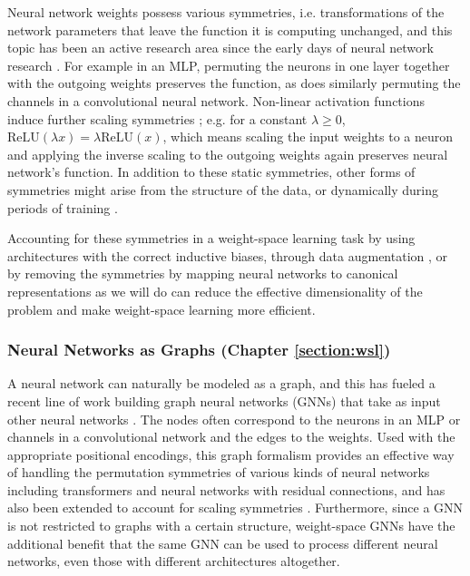Neural network weights possess various symmetries, i.e. transformations of the network parameters that leave the function it is computing unchanged, and this topic has been an active research area since the early days of neural network research \citep{hecht-nielsenALGEBRAICSTRUCTUREFEEDFORWARD1990}. For example in an MLP, permuting the neurons in one layer together with the outgoing weights preserves the function, as does similarly permuting the channels in a convolutional neural network. Non-linear activation functions induce further scaling symmetries \citep{godfreySymmetriesDeepLearning2022}; e.g. for a constant $\lambda \geq 0$, $\text{ReLU}(\lambda x) = \lambda \text{ReLU}(x)$, which means scaling the input weights to a neuron and applying the inverse scaling to the outgoing weights again preserves neural network's function. In addition to these static symmetries, other forms of symmetries might arise from the structure of the data, or dynamically during periods of training \citep{zhaoFindingSymmetryNeural2024}. 

Accounting for these symmetries in a weight-space learning task by using architectures with the correct inductive biases, through data augmentation \citep{shamsianImprovedGeneralizationWeight2024}, or by removing the symmetries by mapping neural networks to canonical representations \citep{pittorinoDeepNetworksToroids2022} as we will do can reduce the effective dimensionality of the problem and make weight-space learning more efficient. 

\subsubsection{Neural Networks as Graphs (Chapter \ref{section:wsl})}

A neural network can naturally be modeled as a graph, and this has fueled a recent line of work building graph neural networks (GNNs) that take as input other neural networks \citep{kofinasGraphNeuralNetworks2024,limGraphMetanetworksProcessing2023,kalogeropoulosScaleEquivariantGraph2024}. The nodes often correspond to the neurons in an MLP or channels in a convolutional network and the edges to the weights. Used with the appropriate positional encodings, this graph formalism provides an effective way of handling the permutation symmetries of various kinds of neural networks including transformers and neural networks with residual connections, and has also been extended to account for scaling symmetries \citep{kalogeropoulosScaleEquivariantGraph2024}. Furthermore, since a GNN is not restricted to graphs with a certain structure, weight-space GNNs have the additional benefit that the same GNN can be used to process different neural networks, even those with different architectures altogether.


